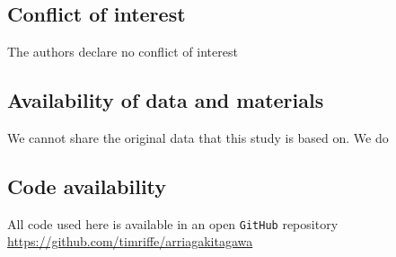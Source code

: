 \documentclass[12pt, sn-apa,pdflatex,letterpaper]{sn-jnl}
\begin{document}
{\subsection*{Conflict of interest}\label{conflict-of-interest}

The authors declare no conflict of interest


\subsection*{Availability of data and
materials}\label{availability-of-data-and-materials}

We cannot share the original data that this study is based on. We do 


\subsection*{Code availability}\label{code-availability}

All code used here is available in an open \texttt{GitHub} repository
\url{https://github.com/timriffe/arriagakitagawa}
}
\end{document}
